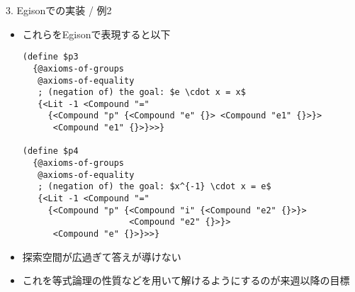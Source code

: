 \documentclass[dvipdfmx,11pt,notheorems]{beamer}
\theoremstyle{definition}
\begin{document}
\begin{frame}[fragile]{3. Egisonでの実装 / 例2}
  \begin{itemize}
    \item これらをEgisonで表現すると以下
    \begin{verbatim}
(define $p3
  {@axioms-of-groups
   @axioms-of-equality
   ; (negation of) the goal: $e \cdot x = x$
   {<Lit -1 <Compound "="
     {<Compound "p" {<Compound "e" {}> <Compound "e1" {}>}>
      <Compound "e1" {}>}>>}

(define $p4
  {@axioms-of-groups
   @axioms-of-equality
   ; (negation of) the goal: $x^{-1} \cdot x = e$
   {<Lit -1 <Compound "="
     {<Compound "p" {<Compound "i" {<Compound "e2" {}>}>
                     <Compound "e2" {}>}>
      <Compound "e" {}>}>>}
    \end{verbatim}

    \item 探索空間が広過ぎて答えが導けない
    \item これを等式論理の性質などを用いて解けるようにするのが来週以降の目標
  \end{itemize}
\end{frame}

\setcounter{framenumber}{\value{finalframe}}
\end{document}
